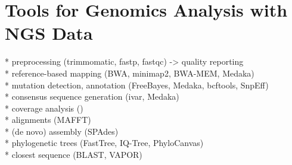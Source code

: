 \section{Tools for Genomics Analysis with NGS Data}
* preprocessing (trimmomatic, fastp, fastqc) -> quality reporting \\
* reference-based mapping (BWA, minimap2, BWA-MEM, Medaka) \\
* mutation detection, annotation (FreeBayes, Medaka, bcftools, SnpEff) \\
* consensus sequence generation (ivar, Medaka) \\
* coverage analysis () \\
* alignments (MAFFT) \\
* (de novo) assembly (SPAdes) \\
* phylogenetic trees (FastTree, IQ-Tree, PhyloCanvas) \\
* closest sequence (BLAST, VAPOR)

